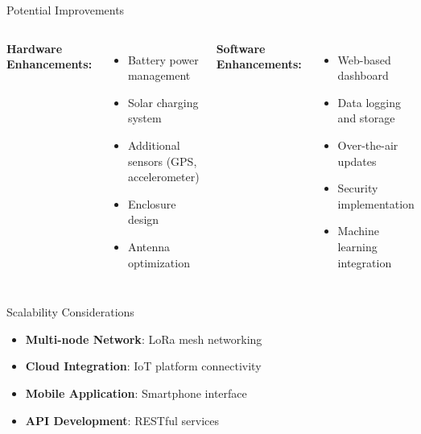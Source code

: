 \documentclass[aspectratio=169]{beamer}
\begin{document}
\begin{frame}{Potential Improvements}
\begin{columns}
\textbf{Hardware Enhancements:}
\begin{itemize}
    \item Battery power management
    \item Solar charging system
    \item Additional sensors (GPS, accelerometer)
    \item Enclosure design
    \item Antenna optimization
\end{itemize}

\textbf{Software Enhancements:}
\begin{itemize}
    \item Web-based dashboard
    \item Data logging and storage
    \item Over-the-air updates
    \item Security implementation
    \item Machine learning integration
\end{itemize}
\end{columns}

\begin{block}{Scalability Considerations}
\begin{itemize}
    \item \textbf{Multi-node Network}: LoRa mesh networking
    \item \textbf{Cloud Integration}: IoT platform connectivity
    \item \textbf{Mobile Application}: Smartphone interface
    \item \textbf{API Development}: RESTful services
\end{itemize}
\end{block}
\end{frame}
\end{document}
